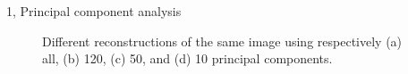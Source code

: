 \documentclass[10pt,a4paper]{article}
\begin{document}
\begin{task}{1, Principal component analysis}
\begin{figure}[H]
    \centering
    \vfill
    \vfill
    \vfill
    \caption{Different reconstructions of the same image using respectively (a) all, (b) 120, (c) 50, and (d) 10 principal components.}
    \label{fig:racoon-recontrs}
\end{figure}


\end{task}
\end{document}
